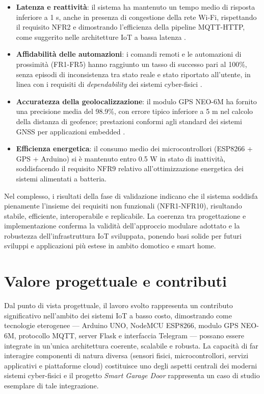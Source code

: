 \begin{itemize}
    \item \textbf{Latenza e reattività}: il sistema ha mantenuto un tempo medio di risposta inferiore a 1 s, anche in presenza di congestione della rete Wi-Fi, rispettando il requisito NFR2 e dimostrando l'efficienza della pipeline MQTT-HTTP, come suggerito nelle architetture IoT a bassa latenza \cite{Amaral2018}.
    \item \textbf{Affidabilità delle automazioni}: i comandi remoti e le automazioni di prossimità (FR1-FR5) hanno raggiunto un tasso di successo pari al 100\%, senza episodi di inconsistenza tra stato reale e stato riportato all'utente, in linea con i requisiti di \textit{dependability} dei sistemi cyber-fisici \cite{Avizienis2004}.
    \item \textbf{Accuratezza della geolocalizzazione}: il modulo GPS NEO-6M ha fornito una precisione media del 98.9\%, con errore tipico inferiore a 5 m nel calcolo della distanza di geofence; prestazioni conformi agli standard dei sistemi GNSS per applicazioni embedded \cite{Zanella2014}.
    \item \textbf{Efficienza energetica}: il consumo medio dei microcontrollori (ESP8266 + GPS + Arduino) si è mantenuto entro 0.5 W in stato di inattività, soddisfacendo il requisito NFR9 relativo all'ottimizzazione energetica dei sistemi alimentati a batteria.
\end{itemize}

Nel complesso, i risultati della fase di validazione indicano che il sistema soddisfa pienamente l'insieme dei requisiti non funzionali (NFR1-NFR10), risultando stabile, efficiente, interoperabile e replicabile. La coerenza tra progettazione e implementazione conferma la validità dell'approccio modulare adottato e la robustezza dell'infrastruttura IoT sviluppata, ponendo basi solide per futuri sviluppi e applicazioni più estese in ambito domotico e smart home.

\section{Valore progettuale e contributi}
Dal punto di vista progettuale, il lavoro svolto rappresenta un contributo significativo nell'ambito dei sistemi IoT a basso costo, dimostrando come tecnologie eterogenee — Arduino UNO, NodeMCU ESP8266, modulo GPS NEO-6M, protocollo MQTT, server Flask e interfaccia Telegram — possano essere integrate in un'unica architettura coerente, scalabile e robusta. La capacità di far interagire componenti di natura diversa (sensori fisici, microcontrollori, servizi applicativi e piattaforme cloud) costituisce uno degli aspetti centrali dei moderni sistemi cyber-fisici \cite{Lee2015} e il progetto \textit{Smart Garage Door} rappresenta un caso di studio esemplare di tale integrazione.

